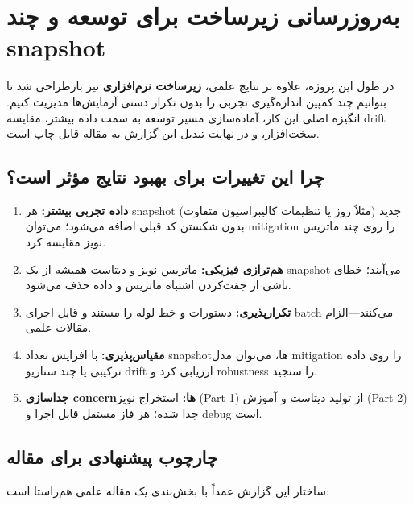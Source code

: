 \section*{به‌روزرسانی زیرساخت برای توسعه و چند snapshot}

در طول این پروژه، علاوه بر نتایج علمی، \textbf{زیرساخت نرم‌افزاری} نیز بازطراحی شد تا بتوانیم چند کمپین اندازه‌گیری تجربی را بدون تکرار دستی آزمایش‌ها مدیریت کنیم. انگیزه اصلی این کار، آماده‌سازی مسیر توسعه به سمت داده بیشتر، مقایسه drift سخت‌افزار، و در نهایت تبدیل این گزارش به مقاله قابل چاپ است.

\subsection*{چرا این تغییرات برای بهبود نتایج مؤثر است؟}

\begin{enumerate}
	\item \textbf{داده تجربی بیشتر:} هر snapshot جدید (مثلاً روز یا تنظیمات کالیبراسیون متفاوت) بدون شکستن کد قبلی اضافه می‌شود؛ می‌توان mitigation را روی چند ماتریس نویز مقایسه کرد.
	\item \textbf{هم‌ترازی فیزیکی:} ماتریس نویز و دیتاست  همیشه از یک snapshot می‌آیند؛ خطای ناشی از جفت‌کردن اشتباه ماتریس و داده حذف می‌شود.
	\item \textbf{تکرارپذیری:} دستورات  و  خط لوله را مستند و قابل اجرای batch می‌کنند---الزام مقالات علمی.
	\item \textbf{مقیاس‌پذیری:} با افزایش تعداد snapshotها، می‌توان مدل mitigation را روی داده ترکیبی یا چند سناریو drift ارزیابی کرد و robustness را سنجید.
	\item \textbf{جداسازی concernها:} استخراج نویز (Part 1) از تولید دیتاست و آموزش (Part 2) جدا شده؛ هر فاز مستقل قابل اجرا و debug است.
\end{enumerate}

\subsection*{چارچوب پیشنهادی برای مقاله}

ساختار این گزارش عمداً با بخش‌بندی یک مقاله علمی هم‌راستا است:

